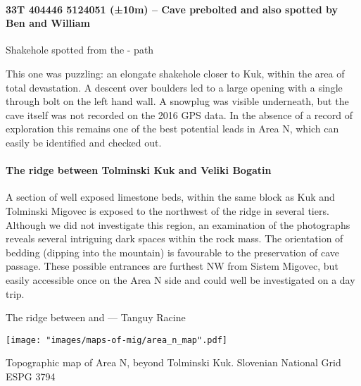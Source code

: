 \paragraph{33T 404446 5124051 (±10m) – Cave prebolted and also spotted by Ben and William}

    \begin{marginfigure}
\centering
{} 
 \caption{Shakehole spotted from the  - \protect{} path}\label{shakehole next to kuk}
\end{marginfigure}

This one was puzzling: an elongate shakehole closer to Kuk, within the area of total devastation. A descent over boulders led to a large opening with a single through bolt on the left hand wall. A snowplug was visible underneath, but the cave itself was not recorded on the 2016 GPS data. In the absence of a record of exploration this remains one of the best potential leads in Area N, which can easily be identified and checked out.

\paragraph{The ridge between Tolminski Kuk and Veliki Bogatin}

A section of well exposed limestone beds, within the same block as Kuk and Tolminski Migovec is exposed to the northwest of the ridge in several tiers. Although we did not investigate this region, an examination of the photographs reveals several intriguing dark spaces within the rock mass. The orientation of bedding (dipping into the mountain) is favourable to the preservation of cave passage.  These possible entrances are furthest NW from Sistem Migovec, but easily accessible once on the Area N side and could well be investigated on a day trip.

\begin{pagefigure}
\checkoddpage \ifoddpage \forcerectofloat \else \forceversofloat \fi
    \caption{ The ridge between \protect{} and \protect{} --- Tanguy Racine }
\end{pagefigure}


 \begin{pagemap}
 \checkoddpage \ifoddpage \forcerectofloat \else \forceversofloat \fi
\centering
  \texttt{[image: "images/maps-of-mig/area\_n\_map".pdf]}
  
  \caption{Topographic map of Area N, beyond Tolminski Kuk. Slovenian National Grid ESPG 3794}
  \label{map:map area n}
 \end{pagemap}
